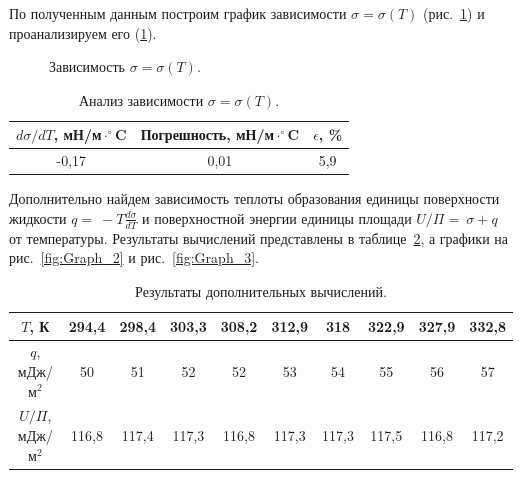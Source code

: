 \documentclass[a4paper,12pt]{article} %
\begin{document}
	По полученным данным построим график зависимости $\sigma = \sigma (T)$ (рис.~\ref{ris:Graph_1}) и проанализируем его (\ref{table:Graph_1}).
	\begin{figure}[H]
		
		\caption{Зависимость $\sigma = \sigma (T)$.}
		\label{ris:Graph_1}
	\end{figure}


\begin{table}[H]
	\caption{Анализ зависимости $\sigma = \sigma (T)$.}
	\label{table:Graph_1}
\begin{tabular}{|c|c|c|}
	\hline
	$d\sigma / d T$, мН/м$\cdot^\circ$C & Погрешность, мН/м$\cdot^\circ$C & $\epsilon$, \% \\ \hline
	-0,17                               & 0,01                            & 5,9            \\ \hline
\end{tabular}
\end{table}


	Дополнительно найдем зависимость теплоты образования единицы поверхности жидкости $q =~-T\frac{d\sigma}{dT}$ и поверхностной энергии единицы площади $U/\Pi =~\sigma + q$ от температуры. Результаты вычислений представлены в таблице~\ref{table:Graph_2-3}, а графики на рис.~\ref{fig:Graph_2} и рис.~\ref{fig:Graph_3}.
	\begin{table}[H]
		\caption{Результаты дополнительных вычислений.}
		\label{table:Graph_2-3}
\begin{tabular}{|c|c|c|c|c|c|c|c|c|c|}
\hline
$T$, К        & 294,4 & 298,4 & 303,3 & 308,2 & 312,9 & 318 & 322,9 & 327,9 & 332,8 \\ \hline
$q$, мДж/м$^2$     & 50  & 51    & 52    & 52    & 53    & 54  & 55  & 56  & 57  \\ \hline
$U/\Pi$, мДж/м$^2$ & 116,8 & 117,4   & 117,3   & 116,8   & 117,3   & 117,3 & 117,5 & 116,8 & 117,2 \\ \hline
\end{tabular}
	\end{table}
	
\end{document}
